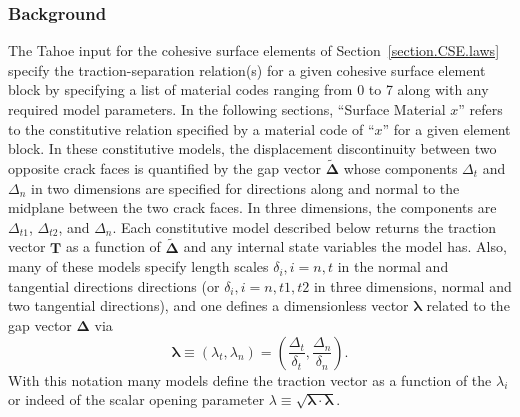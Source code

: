 \subsubsection{Background}
\label{sect.material.surface.common}

The Tahoe input for the cohesive surface elements of 
Section~\ref{section.CSE.laws} specify the traction-separation relation(s)
for a given cohesive surface element block by specifying a list of material
codes ranging from 0 to 7 along with any required model parameters. In
the following sections,  ``Surface Material $x$'' refers to the constitutive 
relation
specified by a material code of ``$x$'' for a given element block. 
In these constitutive models, the displacement discontinuity between two
opposite crack faces is quantified by the gap vector $\tilde{\mathbf{\Delta}}$
whose components $\Delta_t$ and $\Delta_n$ in two dimensions are specified
for directions along and normal to the midplane between the two crack
faces. In three dimensions, the components are $\Delta_{t1}$, $\Delta_{t2}$,
and $\Delta_n$. Each constitutive model described below returns the
traction vector $\mathbf{T}$ as a function of $\tilde{\mathbf{\Delta}}$ and any
internal state variables the model has.  Also, many of these models specify 
length scales $\delta_i, i = n,t$ in the normal and tangential directions
directions (or $\delta_i, i = n,t1,t2$ in three dimensions, normal and 
two tangential directions), and one defines a dimensionless vector
$\mathbf{\lambda}$ related to the gap vector $\mathbf{\Delta}$ via
\begin{equation}
\boldsymbol{\lambda} \equiv (\lambda_t,\lambda_n) 
= (\frac{\Delta_t}{\delta_t}, \frac{\Delta_n}{\delta_n}).
\end{equation}
With this notation many models define the traction
vector as a function of the $\lambda_i$ or indeed of the
scalar opening parameter $\lambda \equiv \sqrt{\boldsymbol{\lambda}
\cdot\boldsymbol{\lambda}}$.

